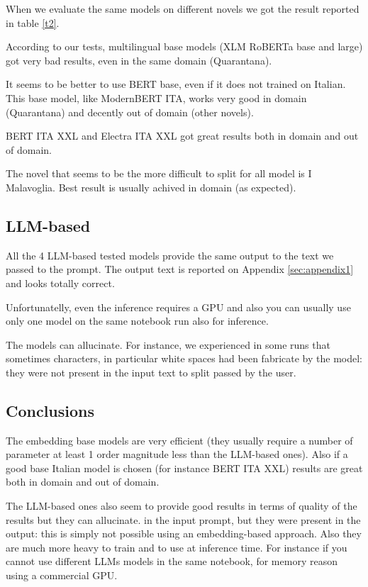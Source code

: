 \documentclass[11pt]{article}
\begin{document}
When we evaluate the same models on different novels we got the
result reported in table \ref{t2}.

According to our tests, multilingual base models (XLM RoBERTa base and large)
got very bad results, even in the same domain (Quarantana).

It seems to be better to use BERT base, even if it does not trained on Italian.
This base model, like ModernBERT ITA, works very good in domain (Quarantana) and
decently out of domain (other novels).

BERT ITA XXL and Electra ITA XXL got great results both in domain and out of domain.

The novel that seems to be the more difficult to split for all model is I Malavoglia.
Best result is usually achived in domain (as expected).

\subsection{LLM-based}

All the 4 LLM-based tested models provide the same output to the text 
we passed to the prompt. The output text is reported on Appendix \ref{sec:appendix1}
and looks totally correct. 

Unfortunatelly, even the inference requires a GPU and also 
you can usually use only one model on the same notebook run 
also for inference.

The models can allucinate. For instance, we experienced in some runs that 
sometimes characters, in particular white spaces had been fabricate by the model: they were not present in the input text to split passed by the user.

\subsection{Conclusions}

The embedding base models are very efficient (they usually require a
number of parameter at least 1 order magnitude less than the LLM-based ones).
Also if a good base Italian model is chosen (for instance BERT ITA XXL)
results are great both in domain and out of domain.

The LLM-based ones also seem to provide good results in terms of quality
of the results but they can allucinate. 
in the input prompt, but they were present in the output: this is simply not possible
using an embedding-based approach.
Also they are much more heavy to train and to use at inference time.
For instance if you cannot use different LLMs models in the same notebook,
for memory reason using a commercial GPU. 
\end{document}
